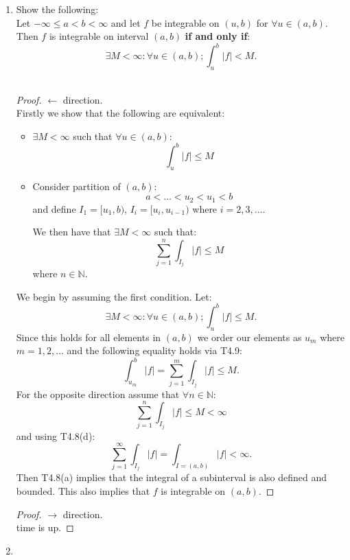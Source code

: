 \begin{enumerate}[resume]
    \item Show the following: \\
    Let $-\infty\leq a<b<\infty$ and let
    $f$ be integrable on $(u,b)$ for $\forall u\in(a,b)$. \\
    Then $f$ is integrable on interval $(a,b)$ \textbf{if and only if}:
    $$\exists M<\infty:\forall u\in(a,b);\int_{u}^{b}|f|<M.$$ \\

    \begin{proof}
        $\leftarrow$ direction. \\
        Firstly we show that the following are equivalent:
        \begin{itemize}
            \item $\exists M<\infty$ such that $\forall u\in(a,b)$:
            $$\int_{u}^{b}|f|\leq M$$
    
            \item Consider partition of $(a,b)$:
            $$a<\dots<u_2<u_1<b$$
            and define $I_1=[u_1,b)$, $I_i=[u_i, u_{i-1})$
            where $i=2,3,\dots$.
    
            We then have that $\exists M<\infty$ such that:
            $$\sum_{j=1}^{n}\int_{I_j}|f|\leq M$$
            where $n\in\mathbb{N}$.
        \end{itemize}
        We begin by assuming the first condition. Let:
        $$\exists M<\infty:\forall u\in(a,b);
        \int_{u}^{b}|f|\leq M.$$
        Since this holds for all elements in $(a,b)$ we
        order our elements as $u_m$ where $m=1,2,\dots$
        and the following equality holds via T4.9:
        $$\int_{u_m}^{b}|f|=\sum_{j=1}^{m}\int_{I_j}|f|\leq M.$$
        For the opposite direction assume that
        $\forall n\in\mathbb{N}$:
        $$\sum_{j=1}^{n}
        \int_{I_j}|f|\leq M<\infty$$
        and using T4.8(d):
        $$\sum_{j=1}^{\infty}\int_{I_j}|f|
        =\int_{I=(a,b)}|f|<\infty.$$
        Then T4.8(a) implies that the integral of a subinterval
        is also defined and bounded.
        This also implies that
        $f$ is integrable on $(a,b)$.
    \end{proof}

    \newpage

    \begin{proof}
        $\rightarrow$ direction. \\
        time is up.
    \end{proof}

    \newpage

    \item
\end{enumerate}